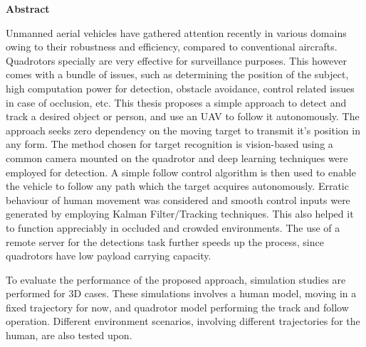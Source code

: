 

\begin{center}
	\huge{\textbf{Abstract}}
\end{center}

Unmanned aerial vehicles have gathered attention recently in various domains owing to their robustness and efficiency, compared to conventional aircrafts. Quadrotors specially are very effective for surveillance purposes. This however comes with a bundle of issues, such as determining the position of the subject, high computation power for detection, obstacle avoidance, control related issues in case of occlusion, etc. This thesis proposes a simple approach to detect and track a desired object or person, and use an UAV to follow it autonomously. The approach seeks zero dependency on the moving target to transmit it’s position in any form. The method chosen for target recognition is vision-based using a common camera mounted on the quadrotor and deep learning techniques were employed for detection. A simple follow control algorithm is then used to enable the vehicle to follow any path which the target acquires autonomously. Erratic behaviour of human movement was considered and smooth control inputs were generated by employing Kalman Filter/Tracking techniques. This also helped it to function appreciably in occluded and crowded environments. The use of a remote server for the detections task further speeds up the process, since quadrotors have low payload carrying capacity.

To evaluate the performance of the proposed approach, simulation studies are performed for 3D cases. These simulations involves a human model, moving in a fixed trajectory for now, and quadrotor model performing the track and follow operation. Different environment scenarios, involving different trajectories for the human, are also tested upon.




















